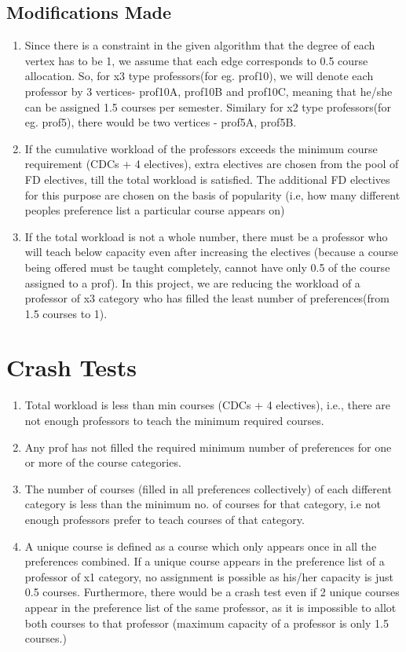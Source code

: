 \documentclass{article}
\begin{document}
\subsection{Modifications Made}
\begin{enumerate}
    \item Since there is a constraint in the given algorithm that the degree of each vertex has to be 1, we assume that each edge corresponds to 0.5 course allocation. So, for x3 type professors(for eg. prof10), we will denote each professor by 3 vertices- prof10A, prof10B and prof10C, meaning that he/she can be assigned 1.5 courses per semester. Similary for x2 type professors(for eg. prof5), there would be two vertices - prof5A, prof5B.
    \item If the cumulative workload of the professors exceeds the minimum course requirement (CDCs + 4 electives), extra electives are chosen from the pool of FD electives, till the total workload is satisfied. The additional FD electives for this purpose are chosen on the basis of popularity (i.e, how many different peoples preference list a particular course appears on)
    \item If the total workload is not a whole number, there must be a professor who will teach below capacity even after increasing the electives (because a course being offered must be taught completely, cannot have only 0.5 of the course assigned to a prof). In this project, we are reducing the workload of a professor of x3 category who has filled the least number of preferences(from 1.5 courses to 1).
    
\end{enumerate}

\section{Crash Tests}
\begin{enumerate}
    \item Total workload is less than min courses (CDCs + 4 electives), i.e., there are not enough professors to teach the minimum required courses.
    \item Any prof has not filled the required minimum number of preferences for one or more of the course categories.
    \item The number of courses (filled in all preferences collectively) of each different category is less than the minimum no. of courses for that category,  i.e not enough professors prefer to teach courses of that category.
    \item A unique course is defined as a course which only appears once in all the preferences combined. If a unique course appears in the preference list of a  professor of x1 category, no assignment is possible as his/her capacity is just 0.5 courses. Furthermore, there would be a crash test even if 2 unique courses appear in the preference list of the same professor, as it is impossible to allot both courses to that professor (maximum capacity of a professor is only 1.5 courses.)
\end{enumerate}
\end{document}
